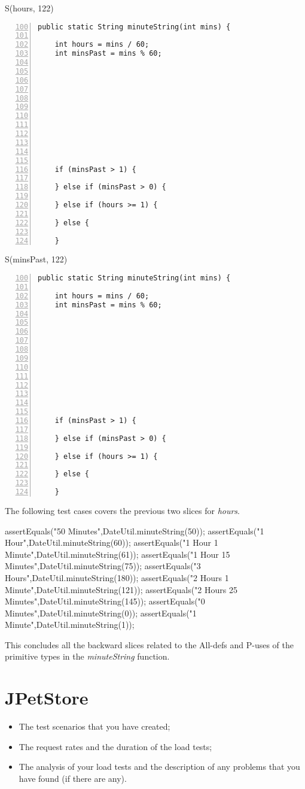 \documentclass[fontsize=12pt,paper=letter,twoside]{scrartcl}
\begin{document}
S(hours, 122)
\begin{lstlisting}[numbers=left,firstnumber=100]
  public static String minuteString(int mins) {
    
    int hours = mins / 60;
    int minsPast = mins % 60;
    
    
    
    
    
     
    
     
    
     
    

    if (minsPast > 1) {
      
    } else if (minsPast > 0) {
      
    } else if (hours >= 1) {
    
    } else {
    
    }
\end{lstlisting}
S(minsPast, 122)
\begin{lstlisting}[numbers=left,firstnumber=100]
  public static String minuteString(int mins) {
    
    int hours = mins / 60;
    int minsPast = mins % 60;
    
    
    
    
    
     
    
     
    
     
    

    if (minsPast > 1) {
      
    } else if (minsPast > 0) {
      
    } else if (hours >= 1) {
    
    } else {
    
    }
\end{lstlisting}
The following test cases covers the previous two slices for \emph{hours}.
\begin{code}
assertEquals("50 Minutes",DateUtil.minuteString(50));
assertEquals("1 Hour",DateUtil.minuteString(60));
assertEquals("1 Hour 1 Minute",DateUtil.minuteString(61));
assertEquals("1 Hour 15 Minutes",DateUtil.minuteString(75));
assertEquals("3 Hours",DateUtil.minuteString(180));
assertEquals("2 Hours 1 Minute",DateUtil.minuteString(121));
assertEquals("2 Hours 25 Minutes",DateUtil.minuteString(145));
assertEquals("0 Minutes",DateUtil.minuteString(0));
assertEquals("1 Minute",DateUtil.minuteString(1));
\end{code}

This concludes all the backward slices related to the All-defs and P-uses of the primitive types in the \emph{minuteString} function.

\section{JPetStore}

\begin{itemize}
\item The test scenarios that you have created;
\item The request rates and the duration of the load tests;
\item The analysis of your load tests and the description of any problems that you have found (if there
are any).
\end{itemize}
\end{document}
